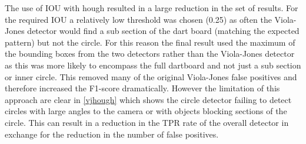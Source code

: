 \documentclass{article}
\begin{document}
\begin{multicols}{2}
The use of IOU with hough resulted in a large reduction in the set of results.
For the required IOU a relatively low threshold was chosen (0.25) as often the
Viola-Jones detector would find a sub section of the dart board (matching the
expected pattern) but not the circle.  For this reason the final result used
the maximum of the bounding boxes from the two detectors rather than the
Viola-Jones detector as this was more likely to encompass the full dartboard
and not just a sub section or inner circle. This removed many of the original
Viola-Jones false positives and therefore increased the F1-score dramatically.
However the limitation of this approach are clear in \ref{vjhough} which shows
the circle detector failing to detect circles with large angles to the camera
or with objects blocking sections of the circle.  This can result in a
reduction in the TPR rate of the overall detector in exchange for the reduction
in the number of false positives.


\end{multicols}
\end{document}

